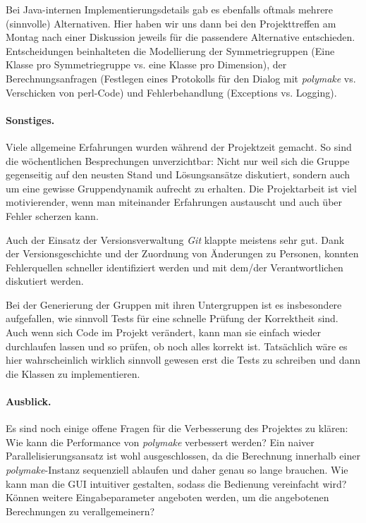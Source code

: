 \noindent Bei Java-internen Implementierungsdetails gab es ebenfalls oftmals mehrere (sinnvolle) Alternativen. Hier haben wir uns dann bei den Projekttreffen am Montag nach einer Diskussion jeweils für die passendere Alternative entschieden. Entscheidungen beinhalteten
die Modellierung der Symmetriegruppen (Eine Klasse pro Symmetriegruppe vs. eine Klasse pro Dimension), der Berechnungsanfragen
(Festlegen eines Protokolls für den Dialog mit \emph{polymake} vs. Verschicken von perl-Code) und
Fehlerbehandlung (Exceptions vs. Logging).

\paragraph{Sonstiges.}
Viele allgemeine Erfahrungen wurden während der Projektzeit gemacht. So sind die wöchentlichen Besprechungen unverzichtbar:
Nicht nur weil sich die Gruppe gegenseitig auf den neusten Stand und Lösungsansätze diskutiert, sondern auch um eine gewisse
Gruppendynamik aufrecht zu erhalten. Die Projektarbeit ist viel motivierender, wenn man miteinander Erfahrungen austauscht
und auch über Fehler scherzen kann.

\noindent Auch der Einsatz der Versionsverwaltung \emph{Git} klappte meistens sehr gut. Dank der Versionsgeschichte und der Zuordnung
von Änderungen zu Personen, konnten Fehlerquellen schneller identifiziert werden und mit dem/der Verantwortlichen diskutiert werden.

\noindent Bei der Generierung der Gruppen mit ihren Untergruppen ist es insbesondere aufgefallen, wie sinnvoll Tests für eine schnelle
Prüfung der Korrektheit sind. Auch wenn sich Code im Projekt verändert, kann man sie einfach wieder durchlaufen lassen und so prüfen,
ob noch alles korrekt ist. Tatsächlich wäre es hier wahrscheinlich wirklich sinnvoll gewesen erst die Tests zu schreiben und dann die
Klassen zu implementieren.

\paragraph{Ausblick.}
Es sind noch einige offene Fragen für die Verbesserung des Projektes zu klären:\\
\noindent Wie kann die Performance von \emph{polymake} verbessert werden? Ein naiver Parallelisierungsansatz ist wohl ausgeschlossen,
da die Berechnung innerhalb einer \emph{polymake}-Instanz sequenziell ablaufen und daher genau so lange brauchen.
Wie kann man die GUI intuitiver gestalten, sodass die Bedienung vereinfacht wird?
Können weitere Eingabeparameter angeboten werden, um die angebotenen Berechnungen zu verallgemeinern?

